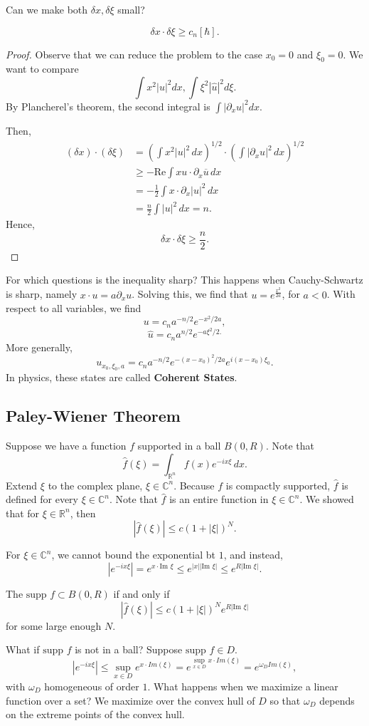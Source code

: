 \documentclass[12pt]{scrartcl}
\newcommand{\R}{\mathbb{R}}
\newcommand{\C}{\mathbb C}
\renewcommand{\hat}{\widehat}
\newcommand{\supp}{\text{supp }}
\begin{document}
Can we make both $\delta x, \delta \xi$ small?  
\begin{thm} 
$$\delta x \cdot \delta \xi \ge c_n[\hbar].$$
\end{thm}
\begin{proof}
Observe that we can reduce the problem to the case $x_0 = 0$ and $\xi_0 = 0$.  We want to compare 
$$\int x^2 |u|^2 dx, \int \xi^2 |\hat{u}|^2 d\xi.$$
By Plancherel's theorem, the second integral is $\int |\partial_x u|^2 dx.$

Then,
\begin{align*}
(\delta x) \cdot (\delta \xi) &= \left (\int x^2 |u|^2\, dx\right)^{1/2} \cdot \left (\int |\partial_x u|^2\,dx\right)^{1/2}  \\
&\ge - \text{Re} \int xu \cdot \partial_x \overline{u} \,dx\\ 
&= - \frac{1}{2}\int x \cdot \partial_x |u|^2 \, dx\\
&= \frac{n}{2}\int |u|^2 \, dx = n.
\end{align*}
Hence, 
$$\delta x \cdot \delta \xi \ge \frac{n}{2}.$$
\end{proof}
For which questions is the inequality sharp?  This happens when Cauchy-Schwartz is sharp, namely $x \cdot u = a \partial_x u$.
Solving this, we find that $u = e^{\frac{x^2}{2a}}$, for $a < 0$.  With respect to all variables, we find 
$$u = c_n a^{-n/2}e^{-x^2/2a},$$
$$\hat{u} = c_n a^{n/2} e^{-a\xi^2/2.}$$
More generally,
$$u_{x_0, \xi_0, a} = c_n a^{-n/2} e^{-(x - x_0)^2/2a}e^{i(x -x_0)\xi_0}.$$
In physics, these states are called \textbf{Coherent States}.
\subsection{Paley-Wiener Theorem}
Suppose we have a function $f$ supported in a ball $B(0, R)$.  Note that 
$$\hat{f}(\xi) = \int_{\R^n} f(x)e^{-ix \xi}\, dx.$$
Extend $\xi$ to the complex plane, $\xi \in \C^n$.  Because $f$ is compactly supported, $\hat{f}$ is defined for every $\xi \in \C^n$.  Note that $\hat{f}$ is an entire function in $\xi \in \C^n$.  We showed that for $\xi \in \R^n$, then $$|\hat{f}(\xi)| \le c(1 + |\xi|)^N.$$

For $\xi \in \C^n$, we cannot bound the exponential bt $1$, and instead,
$$|e^{-ix \xi}| = e^{x \cdot \text{Im }  \xi} \le e^{|x| |\text{Im }\xi| }\le e^{R |\text{Im }\xi|}.$$
\begin{thm} The $\supp f \subset B(0, R)$ if and only if 
$$|\hat{f}(\xi)| \le c(1 + |\xi|)^Ne^{R |\text{Im }\xi|}$$
for some large enough $N$.  
\end{thm}
What if $\supp f$ is not in a ball?  Suppose $\supp f \in D$.  
$$|e^{-ix\xi}| \le \sup_{x \in D} e^{x \cdot Im (\xi)} = e^{\sup_{x \in D} x \cdot Im (\xi)} = e^{\omega_D Im(\xi)},$$
with $\omega_D$ homogeneous of order $1$.  What happens when we maximize a linear function over a set?  We maximize over the convex hull of $D$ so that $\omega_D$ depends on the extreme points of the convex hull.  
\end{document}
